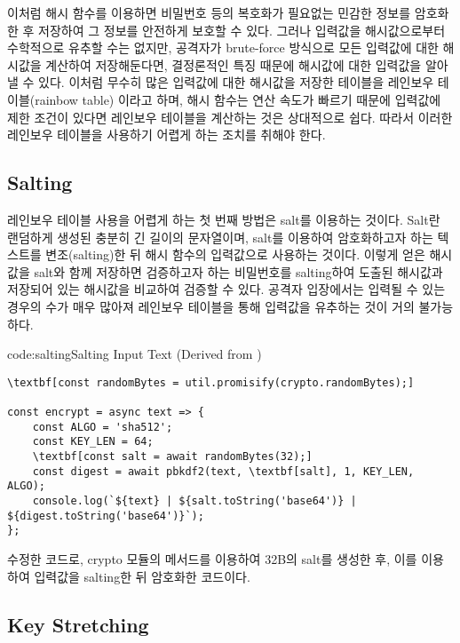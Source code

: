 이처럼 해시 함수를 이용하면 비밀번호 등의 복호화가 필요없는 민감한 정보를 암호화한 후 저장하여 그 정보를 안전하게 보호할 수 있다. 그러나 입력값을 해시값으로부터 수학적으로 유추할 수는 없지만, 공격자가 brute-force 방식으로 모든 입력값에 대한 해시값을 계산하여 저장해둔다면, 결정론적인 특징 때문에 해시값에 대한 입력값을 알아낼 수 있다. 이처럼 무수히 많은 입력값에 대한 해시값을 저장한 테이블을 레인보우 테이블(rainbow table) 이라고 하며, 해시 함수는 연산 속도가 빠르기 때문에 입력값에 제한 조건이 있다면 레인보우 테이블을 계산하는 것은 상대적으로 쉽다. 따라서 이러한 레인보우 테이블을 사용하기 어렵게 하는 조치를 취해야 한다.

\subsection*{Salting}

레인보우 테이블 사용을 어렵게 하는 첫 번째 방법은 salt를 이용하는 것이다. Salt란 랜덤하게 생성된 충분히 긴 길이의 문자열이며, salt를 이용하여 암호화하고자 하는 텍스트를 변조(salting)한 뒤 해시 함수의 입력값으로 사용하는 것이다. 이렇게 얻은 해시값을 salt와 함께 저장하면 검증하고자 하는 비밀번호를 salting하여 도출된 해시값과 저장되어 있는 해시값을 비교하여 검증할 수 있다. 공격자 입장에서는 입력될 수 있는 경우의 수가 매우 많아져 레인보우 테이블을 통해 입력값을 유추하는 것이 거의 불가능하다.

\begin{codeenv}{code:salting}{Salting Input Text (Derived from )}
\begin{Verbatim}[commandchars=\\\[\]]
\textbf[const randomBytes = util.promisify(crypto.randomBytes);]

const encrypt = async text => {
    const ALGO = 'sha512';
    const KEY_LEN = 64;
    \textbf[const salt = await randomBytes(32);]
    const digest = await pbkdf2(text, \textbf[salt], 1, KEY_LEN, ALGO);
    console.log(`${text} | ${salt.toString('base64')} | ${digest.toString('base64')}`);
};
\end{Verbatim}
\end{codeenv}

\은 \을 수정한 코드로, crypto 모듈의  메서드를 이용하여 32B의 salt를 생성한 후, 이를 이용하여 입력값을 salting한 뒤 암호화한 코드이다.

\subsection*{Key Stretching}

